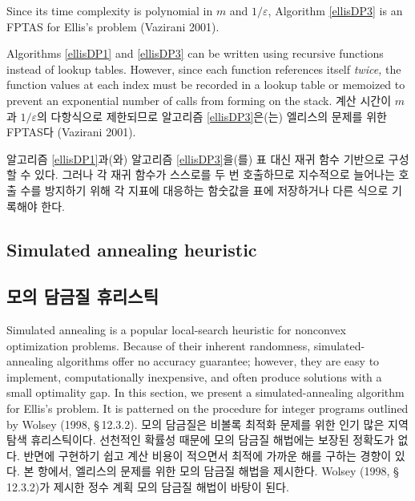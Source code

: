 \documentclass[11pt]{article} %
\theoremstyle{definition}
\theoremstyle{definition}
\begin{document}
\ifen
Since its time complexity is polynomial in $m$ and $1 / \varepsilon$, Algorithm \ref{ellisDP3} is an FPTAS for Ellis's problem (Vazirani 2001). 

Algorithms \ref{ellisDP1} and \ref{ellisDP3} can be written using recursive functions instead of lookup tables. However, since each function references itself \emph{twice,} the function values at each index must be recorded in a lookup table or memoized to prevent an exponential number of calls from forming on the stack.
\else
계산 시간이 $m$과 $1 / \varepsilon$의 다항식으로 제한되므로  알고리즘 \ref{ellisDP3}은(는) 엘리스의 문제를 위한 FPTAS다 (Vazirani 2001). 

알고리즘 \ref{ellisDP1}과(와) 알고리즘 \ref{ellisDP3}을(를) 표 대신 재귀 함수 기반으로 구성할 수 있다. 그러나 각 재귀 함수가 스스로를 두 번 호출하므로 지수적으로 늘어나는 호출 수를 방지하기 위해 각 지표에 대응하는 함숫값을 표에 저장하거나 다른 식으로 기록해야 한다.
\fi


\ifen \subsection{Simulated annealing heuristic} \else \subsection{모의 담금질 휴리스틱} \fi
\ifen
Simulated annealing is a popular local-search heuristic for nonconvex optimization problems. Because of their inherent randomness, simulated-annealing algorithms offer no accuracy guarantee; however, they are easy to implement, computationally inexpensive, and often produce solutions with a small optimality gap. In this section, we present a simulated-annealing algorithm for Ellis's problem. It is patterned on the procedure for integer programs outlined by Wolsey (1998, \S\,12.3.2).
\else
모의 담금질은 비볼록 최적화 문제를 위한 인기 많은 지역 탐색 휴리스틱이다. 선천적인 확률성 때문에 모의 담금질 해법에는 보장된 정확도가 없다. 반면에 구현하기 쉽고 계산 비용이 적으면서 최적에 가까운 해를 구하는 경향이 있다. 본 항에서, 엘리스의 문제를 위한 모의 담금질 해법을 제시한다. Wolsey (1998, \S\,12.3.2)가 제시한 정수 계획 모의 담금질 해법이 바탕이 된다.
\fi
\end{document}
